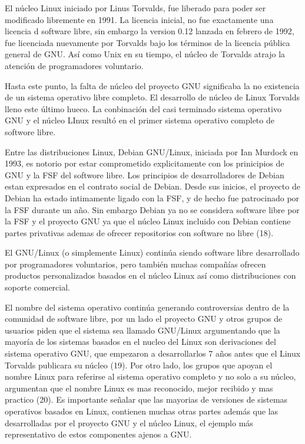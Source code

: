 \documentclass[a4paper,11pt]{article}
\begin{document}
El núcleo Linux iniciado por Linus Torvalds, fue liberado para poder ser modificado libremente en 1991. La licencia inicial, no fue exactamente una licencia d software libre, sin embargo la version 0.12 lanzada en febrero de 1992, fue licenciada nuevamente por Torvalds bajo los términos de la licencia pública general de GNU. Así como Unix en su tiempo, el núcleo de Torvalds atrajo la atención de programadores voluntario.

Hasta este punto, la falta de núcleo del proyecto GNU significaba la no existencia de un sistema operativo libre completo. El desarrollo de núcleo de Linux Torvalds lleno este último hueco. La conbinación del casi terminado sistema operativo GNU y el núcleo LInux resultó en el primer sistema operativo completo de softwore libre.

Entre las distribuciones Linux, Debian GNU/Linux, iniciada por Ian Murdock en 1993, es notorio por estar comprometido explicitamente con los prinicipios de GNU y la FSF del softwore libre. Los principios de desarrolladores de Debian estan expresados en el contrato social de Debian. Desde sus inicios, el proyecto de Debian ha estado intimamente ligado con la FSF, y de hecho fue patrocinado por la FSF durante un año. Sin embargo Debian ya no se considera software libre por la FSF y el proyecto GNU ya que el núcleo Linux incluido con Debian contiene partes privativas ademas de ofrecer repositorios con software no libre (18).

El GNU/Linux (o simplemente Linux) continúa siendo software libre desarrollado por programadores voluntarios, pero también muchas compañías ofrecen productos personalizados basados en el núcleo Linux así como distribuciones con soporte comercial.

El nombre del sistema operativo continúa generando controversias dentro de la comunidad de software libre, por un lado el proyecto GNU y otros grupos de usuarios piden que el sistema sea llamado GNU/Linux argumentando que la mayoría de los sistemas basados en el nucleo del Linux son derivaciones del sistema operativo GNU, que empezaron a desarrollarlos 7 años antes que el Linux Torvalds publicara su núcleo (19). Por otro lado, los grupos que apoyan el nombre Linux para referirse al sistema operativo completo y no solo a su núcleo, argumentan que el nombre Linux es mas reconocido, mejor recibido y mas practico (20). Es importante señalar que las mayorias de versiones de sistemas operativos basados en Linux, contienen muchas otras partes además que las desarrolladas por el proyecto GNU y el núcleo Linux, el ejemplo más representativo de estos componentes ajenos a GNU.
\end{document}
